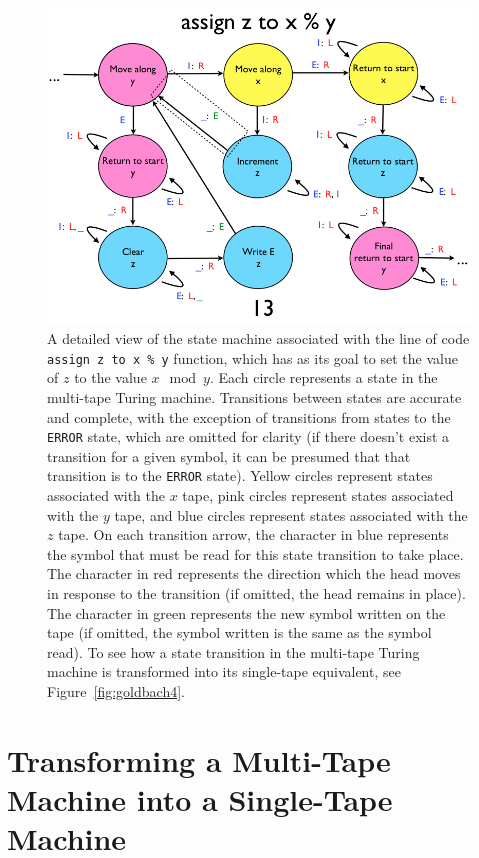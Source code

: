 \begin{figure} 
\begin{center} 
\includegraphics[scale=0.4]{figs/goldbach3.png} 
\caption{A detailed view of the state machine associated with the line of code \texttt{assign z to x \% y} function, which has as its goal to set the value of $z$ to the value $x \mod y$. Each circle represents a state in the multi-tape Turing machine. Transitions between states are accurate and complete, with the exception of transitions from states to the \texttt{ERROR} state, which are omitted for clarity (if there doesn't exist a transition for a given symbol, it can be presumed that that transition is to the \texttt{ERROR} state). Yellow circles represent states associated with the $x$ tape, pink circles represent states associated with the $y$ tape, and blue circles represent states associated with the $z$ tape. On each transition arrow, the character in blue represents the symbol that must be read for this state transition to take place. The character in red represents the direction which the head moves in response to the transition (if omitted, the head remains in place). The character in green represents the new symbol written on the tape (if omitted, the symbol written is the same as the symbol read). To see how a state transition in the multi-tape Turing machine is transformed into its single-tape equivalent, see Figure~\ref{fig:goldbach4}. \label{fig:goldbach3}}
\end{center} 
\end{figure}

\section{Transforming a Multi-Tape Machine into a Single-Tape Machine \label{sec:mttostgoldbach}}

